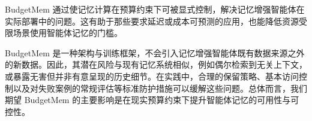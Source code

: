\documentclass{article}
\theoremstyle{plain}
\theoremstyle{definition}
\theoremstyle{remark}
\begin{document}
BudgetMem 通过使记忆计算在预算约束下可被显式控制，解决记忆增强智能体在实际部署中的问题。这有助于那些要求延迟或成本可预测的应用，也能降低资源受限场景使用智能体记忆的门槛。

BudgetMem 是一种架构与训练框架，不会引入记忆增强智能体既有数据来源之外的新数据。因此，其潜在风险与现有记忆系统相似，例如偶尔检索到无关上下文，或暴露无害但并非有意呈现的历史细节。在实践中，合理的保留策略、基本访问控制以及对失败案例的常规评估等标准防护措施可以缓解这些问题。总体而言，我们期望 BudgetMem 的主要影响是在现实预算约束下提升智能体记忆的可用性与可控性。















\newpage
\appendix
\onecolumn




\end{document}
